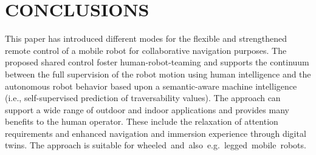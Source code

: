 \documentclass[letterpaper, 10 pt, conference]{ieeeconf}  %
\begin{document}
\section{CONCLUSIONS}
This paper has introduced different modes for the flexible and strengthened remote control of a mobile robot for collaborative navigation purposes. The proposed  shared control foster human-robot-teaming and supports the continuum between the full supervision of the robot motion using human intelligence  and the autonomous robot behavior based upon a semantic-aware machine intelligence (i.e., self-supervised prediction of traversability values). The approach can support a wide range of outdoor and indoor applications and provides many benefits to the human operator. These include the relaxation of attention requirements and enhanced navigation and immersion experience through digital twins. The approach is suitable for  \mbox{wheeled and also e.g. legged mobile robots.}

\addtolength{\textheight}{-12cm}   %







\end{document}
